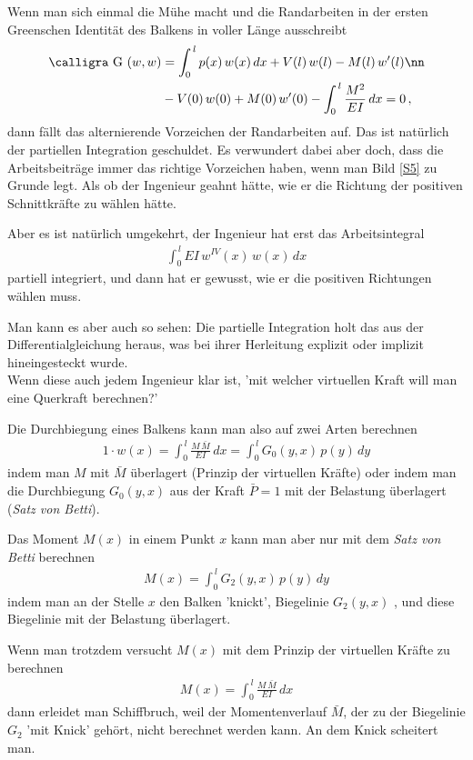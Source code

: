 {Wenn man sich einmal die M\"{u}he macht und die Randarbeiten in der ersten Greenschen Identit\"{a}t des Balkens in voller L\"{a}nge ausschreibt
\begin{align}\label{Eq24}
\text{\normalfont\calligra G\,\,}(w, w) &= \int_0^{\,l} p(x)\,w(x)\,dx + V(l)\,w(l) - M(l)\,w'(l) \nn \\
&- V(0)\,w(0) + M(0)\,w'(0) - \int_0^{\,l} \frac{M^2}{EI}\,dx = 0\,,
\end{align}
dann f\"{a}llt das alternierende Vorzeichen der Randarbeiten auf. Das ist nat\"{u}rlich der partiellen Integration geschuldet. Es verwundert dabei aber doch, dass die Arbeitsbeitr\"{a}ge
immer das richtige Vorzeichen haben, wenn man Bild \ref{S5} zu Grunde legt. Als ob der Ingenieur geahnt h\"{a}tte, wie er die Richtung der positiven Schnittkr\"{a}fte zu w\"{a}hlen h\"{a}tte.

Aber es ist nat\"{u}rlich umgekehrt, der Ingenieur hat erst das Arbeitsintegral
\begin{align}
\int_0^{\,l} EI\,w^{IV}(x)\,w(x)\,dx
\end{align}
partiell integriert, und dann hat er gewusst, wie er die positiven Richtungen w\"{a}hlen muss.

Man kann es aber auch so sehen: Die partielle Integration holt das aus der Differentialgleichung heraus, was bei ihrer Herleitung explizit oder implizit hineingesteckt wurde.
\\

Wenn diese auch jedem Ingenieur klar ist, 'mit welcher virtuellen Kraft will man eine Querkraft berechnen?'

Die Durchbiegung eines Balkens kann man also auf zwei Arten berechnen
\begin{align}
1 \cdot w(x) = \int_0^{\,l} \frac{M\,\bar{M}}{EI}\,dx = \int_0^{\,l} G_0(y,x)\,p(y)\,dy
\end{align}
indem man $M$ mit $\bar{M}$ \"{u}berlagert (Prinzip der virtuellen Kr\"{a}fte) oder indem man die Durchbiegung $G_0(y,x)$ aus der Kraft $\bar{P} = 1$ mit der Belastung \"{u}berlagert ({\em Satz von Betti\/}).

Das Moment $M(x)$ in einem Punkt $x$ kann man aber nur mit dem {\em Satz von Betti\/} berechnen
\begin{align}
M(x) = \int_0^{\,l} G_2(y,x)\,p(y)\,dy
\end{align}
indem man an der Stelle $x$ den Balken 'knickt', Biegelinie $G_2(y,x)$ , und diese Biegelinie mit der Belastung \"{u}berlagert.

Wenn man trotzdem versucht $M(x)$ mit dem Prinzip der virtuellen Kr\"{a}fte zu berechnen
\begin{align}
M(x) = \int_0^{\,l} \frac{M\,\bar{M}}{EI}\,dx
\end{align}
dann erleidet man Schiffbruch, weil der Momentenverlauf $\bar{M}$, der zu der Biegelinie $G_2$ 'mit Knick' geh\"{o}rt, nicht berechnet werden kann. An dem Knick scheitert man.\\

}
